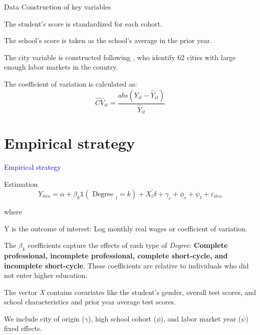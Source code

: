 \documentclass[11pt, aspectratio=169]{beamer}
\newenvironment{transitionframe}{
  \setbeamercolor{background canvas}{bg=gray}
  \begin{frame}}{
    \end{frame}
}
\newenvironment{wideitemize}{\itemize\addtolength{\itemsep}{10pt}}{\enditemize}
\begin{document}
\begin{frame}{Data}
    Construction of key variables
    \begin{wideitemize}
        \item The student’s score is standardized for each cohort.
        \item The school’s score is taken as the school’s average in the prior year.
        \item The city variable is constructed following \citet{o2019commuting} , who identify 62 cities with large enough labor markets in the country.
        \item The coefficient of variation is calculated as:
    \end{wideitemize}
    \vfill
    \begin{equation*}
        \widehat{CV}_{it} = \frac{abs(Y_{it} - \widehat{Y}_{it})}{\widehat{Y}_{it}}
    \end{equation*}
\end{frame}


\section{Empirical strategy}

\begin{transitionframe}
  \begin{center}
    { \huge \textcolor{blue}{Empirical strategy}}
  \end{center}
\end{transitionframe}

\begin{frame}{Estimation}
\begin{equation*}
    Y_{i t c s}=\alpha+\beta_k \mathbb{1}\left(\text { Degree }_i=k\right)+X_i^{\prime} \delta+\gamma_c+\phi_s+\psi_t+\varepsilon_{i t c s}
\end{equation*}

where

\begin{wideitemize}
    \item Y is the outcome of interest: Log monthly real wages or coefficient of variation.
    \item The $\beta_k$ coefficients capture the effects of each type of \textit{Degree}: \textbf{Complete professional, incomplete professional, complete short-cycle, and incomplete short-cycle}. These coefficients are relative to individuals who did not enter higher education.
    \item The vector \textit{X} contains covariates like the student’s gender, overall test scores, and school characteristics and prior year average test scores.
    \item We include city of origin ($\gamma$), high school cohort ($\phi$), and labor market year ($\psi$) fixed effects. 
\end{wideitemize}

\vfill
\end{frame}
\end{document}

